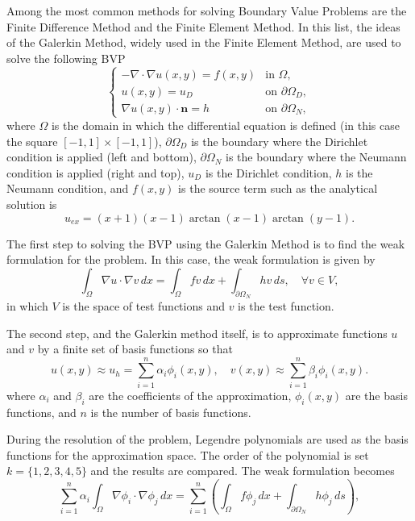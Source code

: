 Among the most common methods for solving Boundary Value Problems are the Finite Difference Method and the Finite Element Method. In this list, the ideas of the Galerkin Method, widely used in the Finite Element Method, are used to solve the following BVP
\begin{equation}
    \begin{cases}
        -\nabla \cdot \nabla u(x, y) = f(x, y) & \text{in } \Omega, \\
        u(x, y) = u_D & \text{on } \partial \Omega_D, \\
        \nabla u(x, y) \cdot \bm{n} = h & \text{on } \partial \Omega_N,
    \end{cases}
\end{equation}
where $\Omega$ is the domain in which the differential equation is defined (in this case the square $[-1, 1] \times [-1, 1]$), $\partial \Omega_D$ is the boundary where the Dirichlet condition is applied (left and bottom), $\partial \Omega_N$ is the boundary where the Neumann condition is applied (right and top), $u_D$ is the Dirichlet condition, $h$ is the Neumann condition, and $f(x, y)$ is the source term such as the analytical solution is 
\begin{equation}
    u_{ex} = (x+1)(x-1)\arctan(x-1)\arctan(y-1).
\end{equation}

The first step to solving the BVP using the Galerkin Method is to find the weak formulation for the problem. In this case, the weak formulation is given by
\begin{equation}
    \int_{\Omega} \nabla u \cdot \nabla v \, dx = \int_{\Omega} fv \, dx + \int_{\partial \Omega_N} hv \, ds, \quad \forall v \in V,
\end{equation}
in which $V$ is the space of test functions and $v$ is the test function. 

The second step, and the Galerkin method itself, is to approximate functions $u$ and $v$ by a finite set of basis functions so that 
\begin{equation}
    u(x, y) \approx u_h = \sum_{i=1}^{n} \alpha_i \phi_i(x, y), \quad v(x, y) \approx \sum_{i=1}^{n} \beta_i \phi_i(x, y).
\end{equation}
where $\alpha_i$ and $\beta_i$ are the coefficients of the approximation, $\phi_i(x, y)$ are the basis functions, and $n$ is the number of basis functions.

During the resolution of the problem, Legendre polynomials are used as the basis functions for the approximation space. The order of the polynomial is set $k=\{1,2,3,4,5\}$ and the results are compared. The weak formulation becomes
\begin{equation}
    \sum_{i=1}^{n} \alpha_i \int_{\Omega} \nabla \phi_i \cdot \nabla \phi_j \, dx = \sum_{i=1}^{n}\left(\int_{\Omega} f\phi_j \, dx + \int_{\partial \Omega_N} h\phi_j \, ds\right), 
\end{equation}

